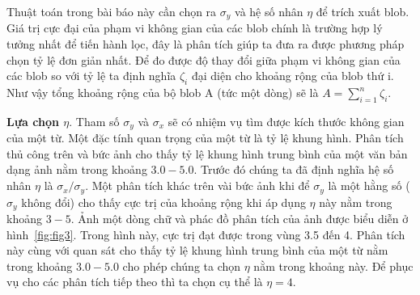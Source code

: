 \documentclass[a4paper]{article}
\begin{document}
Thuật toán trong bài báo này cần chọn ra $\sigma_y$ và hệ số nhân $\eta $ để trích xuất blob. Giá trị cực đại của phạm vi không gian của các blob chính là trường hợp lý tưởng nhất để tiến hành lọc, đây là phân tích giúp ta đưa ra được phương pháp chọn tỷ lệ đơn giản nhất. Để đo được độ thay đổi giữa phạm vi không gian của các blob so với tỷ lệ ta định nghĩa $\zeta_i$ đại diện cho khoảng rộng của blob thứ i. Như vậy tổng khoảng rộng của bộ blob A (tức một dòng) sẽ là $A = \sum_{i = 1}^{n} \zeta_i$.\par

\textbf{Lựa chọn $\eta$}. Tham số $\sigma_y$ và $\sigma_x$ sẽ có nhiệm vụ tìm được kích thước không gian của một từ. Một đặc tính quan trọng của một từ là tỷ lệ khung hình. Phân tích thủ công trên và bức ảnh cho thấy tỷ lệ khung hình trung bình của một văn bản dạng ảnh nằm trong khoảng $3.0 - 5.0$. Trước đó chúng ta đã định nghĩa hệ số nhân $\eta$ là $\sigma_x / \sigma_y$. Một phân tích khác trên vài bức ảnh khi để $\sigma_y$ là một hằng số ($\sigma_y$ không đổi) cho thấy cực trị của khoảng rộng khi áp dụng $\eta$ này nằm trong khoảng $3 - 5$. Ảnh một dòng chữ và phác đồ phân tích của ảnh được biểu diễn ở hình~\ref{fig:fig3}. Trong hình này, cực trị đạt được trong vùng 3.5 đến 4. Phân tích này cùng với quan sát cho thấy tỷ lệ khung hình trung bình của một từ nằm trong khoảng $3.0 - 5.0$ cho phép chúng ta chọn $\eta$ nằm trong khoảng này. Để phục vụ cho các phân tích tiếp theo thì ta chọn cụ thể là $\eta = 4$.
\end{document}
